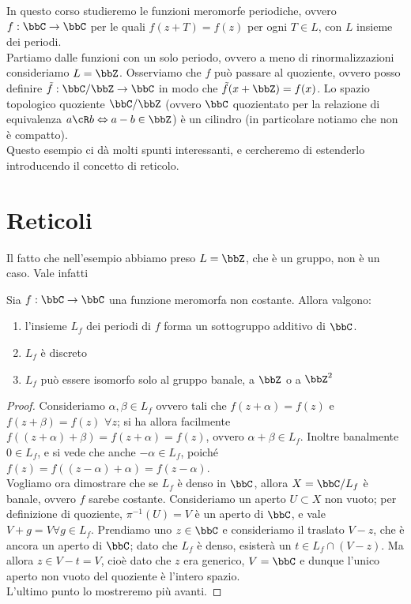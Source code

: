 
In questo corso studieremo le funzioni meromorfe periodiche, ovvero $f:\bbC\to\bbC$ per le quali $f(z+T)=f(z)$ per ogni $T\in L$, con $L$ insieme dei periodi.\\
Partiamo dalle funzioni con un solo periodo, ovvero a meno di rinormalizzazioni consideriamo $L=\bbZ$.  Osserviamo che $f$ può passare al quoziente, ovvero posso definire $\tilde f:\bbC / \bbZ\to\bbC$ in modo che $\tilde f(x+\bbZ)=f(x)$. Lo spazio topologico quoziente $\bbC / \bbZ$ (ovvero $\bbC$ quozientato per la relazione di equivalenza $a \cR b \sse a-b \in \bbZ$) è un cilindro (in particolare notiamo che non è compatto).\\
Questo esempio ci dà molti spunti interessanti, e cercheremo di estenderlo introducendo il concetto di reticolo.\\

\section{Reticoli}
Il fatto che nell'esempio abbiamo preso $L=\bbZ$, che è un gruppo, non è un caso. Vale infatti
\begin{lemma}
  Sia $f: \bbC \rar \bbC$ una funzione meromorfa non costante.  Allora valgono:
  \begin{enumerate}
      \item l'insieme $L_f$ dei periodi di $f$ forma un sottogruppo additivo di $\bbC$.
      \item $L_f$ è discreto
      \item $L_f$ può essere isomorfo solo al gruppo banale, a $\bbZ$ o a $\bbZ^2$
  \end{enumerate}
\end{lemma}
\begin{proof}
      Consideriamo $\alpha,\beta\in L_f$ ovvero tali che $f(z + \alpha) = f(z)$ e $f(z + \beta) = f(z)$ $\forall z$; si ha allora facilmente $f((z + \alpha) + \beta) = f(z + \alpha) = f(z)$, ovvero $\alpha+\beta\in L_f$. Inoltre banalmente $0\in L_f$, e si vede che anche $-\alpha\in L_f$, poiché $f(z)=f((z-\alpha)+\alpha)=f(z-\alpha)$.\\
      Vogliamo ora dimostrare che se $L_f$ è denso in $\bbC$, allora $X=\bbC / L_f$ è banale, ovvero $f$ sarebe costante. Consideriamo un aperto $U\subset X$ non vuoto; per definizione di quoziente, $\pi^{-1}(U)=V$ è un aperto di $\bbC$, e vale $V+g=V\forall g\in L_f$. Prendiamo uno $z\in\bbC$ e consideriamo il traslato $V-z$, che è ancora un aperto di $\bbC$; dato che $L_f$ è denso, esisterà un $t\in L_f\cap (V-z)$. Ma allora $z\in V-t=V$, cioè dato che $z$ era generico, $V=\bbC$ e dunque l'unico aperto non vuoto del quoziente è l'intero spazio.\\
      L'ultimo punto lo mostreremo più avanti.
\end{proof}

